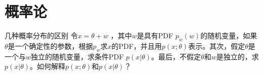 \chapter{概率论}

\begin{example}{}{几种概率分布的区别}
    令$x = \theta + w$ ，其中$w$是具有PDF $p_w(w)$的随机变量，如果$\theta$是一个确定性的参数，根据$p_w$求$x$的PDF，并且用$p(x;\theta)$表示。其次，假定$\theta$是一个与$w$独立的随机变量，求条件PDF $p(x|\theta)$。最后，不假定$\theta$和$w$是独立的，求$p(x|\theta)$。如何解释$p(x;\theta)$和$p(x|\theta)$？
    
\end{example}